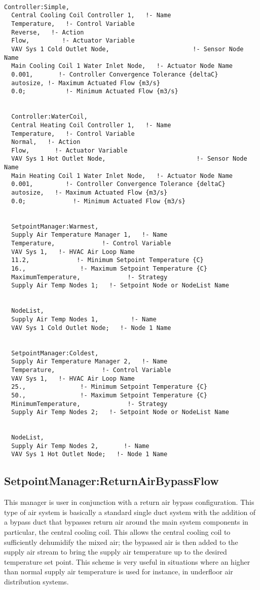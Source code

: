 \begin{lstlisting}

Controller:Simple,
  Central Cooling Coil Controller 1,   !- Name
  Temperature,   !- Control Variable
  Reverse,   !- Action
  Flow,         !- Actuator Variable
  VAV Sys 1 Cold Outlet Node,                       !- Sensor Node Name
  Main Cooling Coil 1 Water Inlet Node,   !- Actuator Node Name
  0.001,       !- Controller Convergence Tolerance {deltaC}
  autosize, !- Maximum Actuated Flow {m3/s}
  0.0;           !- Minimum Actuated Flow {m3/s}


  Controller:WaterCoil,
  Central Heating Coil Controller 1,   !- Name
  Temperature,   !- Control Variable
  Normal,   !- Action
  Flow,       !- Actuator Variable
  VAV Sys 1 Hot Outlet Node,                         !- Sensor Node Name
  Main Heating Coil 1 Water Inlet Node,   !- Actuator Node Name
  0.001,         !- Controller Convergence Tolerance {deltaC}
  autosize,   !- Maximum Actuated Flow {m3/s}
  0.0;             !- Minimum Actuated Flow {m3/s}


  SetpointManager:Warmest,
  Supply Air Temperature Manager 1,   !- Name
  Temperature,             !- Control Variable
  VAV Sys 1,   !- HVAC Air Loop Name
  11.2,             !- Minimum Setpoint Temperature {C}
  16.,               !- Maximum Setpoint Temperature {C}
  MaximumTemperature,             !- Strategy
  Supply Air Temp Nodes 1;   !- Setpoint Node or NodeList Name


  NodeList,
  Supply Air Temp Nodes 1,         !- Name
  VAV Sys 1 Cold Outlet Node;   !- Node 1 Name


  SetpointManager:Coldest,
  Supply Air Temperature Manager 2,   !- Name
  Temperature,             !- Control Variable
  VAV Sys 1,   !- HVAC Air Loop Name
  25.,               !- Minimum Setpoint Temperature {C}
  50.,               !- Maximum Setpoint Temperature {C}
  MinimumTemperature,             !- Strategy
  Supply Air Temp Nodes 2;   !- Setpoint Node or NodeList Name


  NodeList,
  Supply Air Temp Nodes 2,       !- Name
  VAV Sys 1 Hot Outlet Node;   !- Node 1 Name
\end{lstlisting}

\subsection{SetpointManager:ReturnAirBypassFlow}\label{setpointmanagerreturnairbypassflow}

This manager is user in conjunction with a return air bypass configuration. This type of air system is basically a standard single duct system with the addition of a bypass duct that bypasses return air around the main system components in particular, the central cooling coil. This allows the central cooling coil to sufficiently dehumidify the mixed air; the bypassed air is then added to the supply air stream to bring the supply air temperature up to the desired temperature set point. This scheme is very useful in situations where an higher than normal supply air temperature is used for instance, in underfloor air distribution systems.

